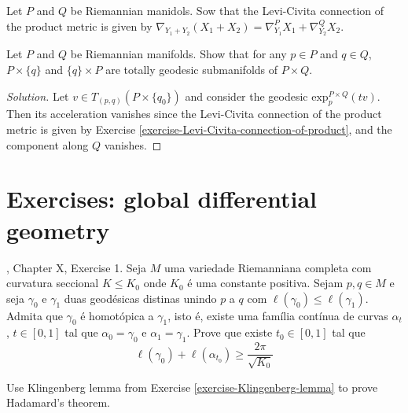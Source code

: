 \begin{exercise}
\label{exercise-Levi-Civita-connection-of-product}
Let $P$ and $Q$ be Riemannian manidols. Sow that the Levi-Civita connection of
the product metric is given by
$\nabla_{Y_1+Y_2}(X_1+X_2)=\nabla^P_{Y_1}X_1+\nabla^Q_{Y_2}X_2$.
\end{exercise}

\begin{exercise}
\label{exercise-totally-geodesic-submanifolds-of-product}
Let $P$ and $Q$ be Riemannian manifolds. Show that for any $p \in P$ and $q \in
Q$, $P\times \{q\}$ and $\{q\}\times P$ are totally geodesic
submanifolds of $P \times Q$.
\end{exercise}

\begin{proof}[Solution]
Let $v \in T_{(p,q)}(P\times\{q_0\})$ and consider the geodesic
 $\text{exp}_p^{P\times Q}(tv)$. Then
its acceleration vanishes since the Levi-Civita connection of the product metric
is given by Exercise \ref{exercise-Levi-Civita-connection-of-product}, and the
component along $Q$ vanishes.
\end{proof}

\section{Exercises: global differential geometry}
\label{section-exercises-global-differential-geometry}

\begin{exercise}
\label{exercise-Klingenberg-lemma}
\cite{doc}, Chapter X, Exercise 1. Seja $M$ uma variedade Riemanniana
completa com curvatura seccional $K \leq  K_0$ onde $K_0$ é uma constante
positiva. Sejam $p,q \in M$ e seja $\gamma_0$ e $\gamma_1$ duas geodésicas
distinas unindo $p$ a $q$ com  $\ell(\gamma_0) \leq  \ell(\gamma_1)$.
Admita que $\gamma_0$ é homotópica a $\gamma_1$, isto é, existe uma família
contínua de curvas $\alpha_t$, $t \in [0,1]$ tal que $\alpha_0 = \gamma_0$
e $\alpha_1=\gamma_1$. Prove que existe $t_0 \in [0,1]$ tal que
$$
\ell(\gamma_0)+\ell(\alpha_{t_0}) \geq  \frac{2\pi}{\sqrt{K_0} }
$$
\end{exercise}

\begin{exercise}
\label{exercise-Hadamard-via-Kingenberg}
Use Klingenberg lemma from Exercise \ref{exercise-Klingenberg-lemma} to prove
Hadamard's theorem.
\end{exercise}

